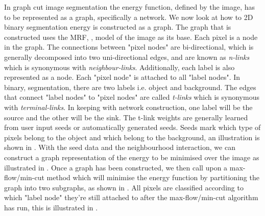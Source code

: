 In graph cut image segmentation the energy function, defined by the image, has to be represented as a graph, specifically a network. We now look at how to 2D binary segmentation energy is constructed as a graph. The graph that is constructed uses the MRF, , model of the image as its base. Each pixel is a node in the graph. The connections between "pixel nodes" are bi-directional, which is generally decomposed into two uni-directional edges, and are known as \textit{n-links} which is synonymous with \textit{neighbour-links}. Additionally, each label is also represented as a node. Each "pixel node" is attached to all "label nodes". In binary, segmentation, there are two labels i.e. object and background. The edges that connect "label nodes" to "pixel nodes" are called \textit{t-links} which is synonymous with \textit{terminal-links}. In keeping with network construction, one label will be the source and the other will be the sink. The t-link weights are generally learned from user input seeds or automatically generated seeds. Seeds mark which type of pixels belong to the object and which belong to the background, an illustration is shown in . With the seed data and the neighbourhood interaction, we can construct a graph representation of the energy to be minimised over the image as illustrated in . Once a graph has been constructed, we then call upon a max-flow/min-cut method which will minimise the energy function by partitioning the graph into two subgraphs, as shown in . All pixels are classified according to which "label node" they're still attached to after the max-flow/min-cut algorithm has run, this is illustrated in .

